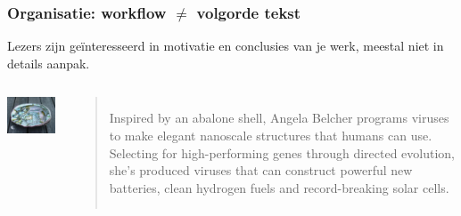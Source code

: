 \documentclass{beamer}
\begin{document}
\begin{frame}
  \frametitle{Organisatie: workflow $\ne$ volgorde tekst}

  Lezers zijn geïnteresseerd in motivatie en conclusies van je werk, meestal niet in details aanpak.

  \vfill

  \begin{columns}
    \includegraphics[width=\textwidth]{img/oef2-06}

    \begin{quotation}
      Inspired by an abalone shell, Angela Belcher programs viruses to make elegant nanoscale structures that humans can use. Selecting for high-performing genes through directed evolution, she’s produced viruses that can construct powerful new batteries, clean hydrogen fuels and record-breaking solar cells.
    \end{quotation}
  \end{columns}
\end{frame}
\end{document}
